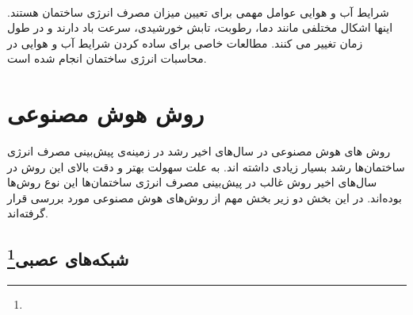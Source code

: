 \\
شرایط آب و هوایی عوامل مهمی برای تعیین میزان مصرف انرژی ساختمان هستند. اینها اشکال مختلفی مانند دما، رطوبت، تابش خورشیدی، سرعت باد دارند و در طول زمان تغییر می کنند. مطالعات خاصی برای ساده کردن شرایط آب و هوایی در محاسبات انرژی ساختمان انجام شده است.






\section{روش هوش مصنوعی}

روش های هوش مصنوعی در سال‌های اخیر رشد در زمینه‌ی پیش‌بینی مصرف انرژی ساختمان‌ها رشد بسیار زیادی داشته اند. به علت سهولت بهتر و دقت بالای این روش در سال‌های اخیر روش غالب در پیش‌بینی مصرف انرژی ساختمان‌ها این نوع روش‌ها بوده‌اند. 
در این بخش دو زیر بخش مهم از روش‌های هوش مصنوعی مورد بررسی قرار گرفته‌اند. 

\subsection{شبکه‌های عصبی\footnote{}}

